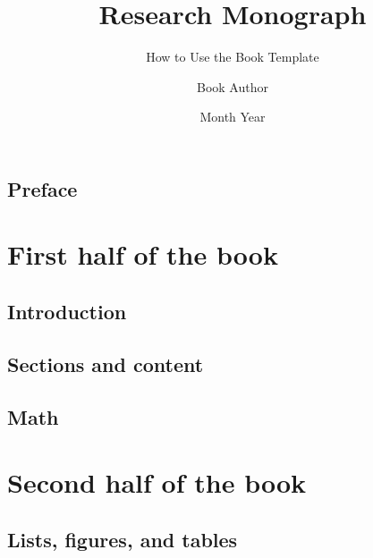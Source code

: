 \documentclass[letterpaper,11pt,leqno]{book}
\begin{document}
\title{Research Monograph}

\subtitle{How to Use the Book Template}

\author{Book Author}

\date{Month Year}

\begin{titlepage}
\maketitle
\end{titlepage}

\frontmatter

\tableofcontents

\chapter{Preface}



\mainmatter

\part{First half of the book}\label{p:first}

\chapter{Introduction}\label{c:introduction}



\chapter{Sections and content}\label{c:section}



\chapter{Math}\label{c:math}



\part{Second half of the book}\label{p:second}

\chapter{Lists, figures, and tables}\label{c:figures}
\end{document}
